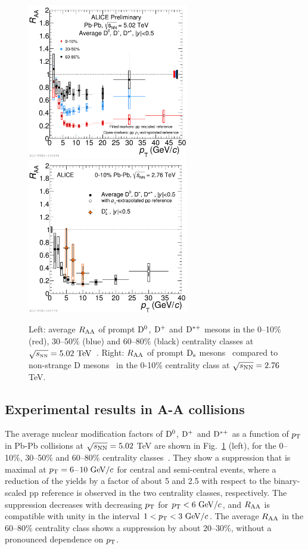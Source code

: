 \begin{figure}[!ht]
  \centering
    \includegraphics[width=7cm]{FigCap2/2017-Jul-05-DmesonAverage_010_3050_6080_comparison_04July2017.pdf}
    \includegraphics[width=7cm]{FigCap2/RAADsD_276.pdf}
  \caption{Left: average $R_{\rm AA}$ 
  of prompt ${\rm D^0}$, ${\rm D^+}$ and ${\rm D^{*+}}$ mesons in the 0--10\% (red), 30--50\% (blue) and 60--80\% (black) centrality classes at $\sqrt{s_{\rm \scriptscriptstyle NN}}=5.02~\mathrm{TeV}$~\cite{ALICE-PUBLIC-2017-003}. Right: $R_{\rm AA}$ of prompt ${\rm D_s}$ mesons~\cite{Adam:2015jda} compared to non-strange D mesons~\cite{Adam:2015sza} in the 0-10\% centrality class at $\sqrt{s_{\rm NN}} = 2.76$ TeV. }
  \label{fig:Raa}
\end{figure}
\subsection{Experimental results in A-A collisions}
The average nuclear modification factors of ${\rm D^0}$, ${\rm D^+}$ and ${\rm D^{*+}}$ as a function of
$p_{\rm T}$ in Pb-Pb collisions at $\sqrt{s_{\rm NN}} = 5.02 $ TeV are shown in Fig.~\ref{fig:Raa} (left), 
for the 0--10\%, 30--50\% and 60--80\% centrality classes~\cite{ALICE-PUBLIC-2017-003}. 
They show a suppression that is
maximal at $p_{\rm T}=6$--$10~\mathrm{GeV}/c$ for central and semi-central events, where a reduction of the yields by
a factor of about 5 and 2.5 with respect to the binary-scaled pp reference is observed 
in the two centrality classes, respectively.
The suppression decreases with decreasing $p_{\rm T}$ for $p_{\rm T}<6~\mathrm{GeV}/c$, and 
$R_{\rm AA}$ is compatible with unity  in the interval $1<p_{\rm T}<3~\mathrm{GeV}/c$.
The average $R_{\rm AA}$ in the 60--80\% centrality class shows a suppression by about 20--30\%, without a pronounced dependence on $p_{\rm T}$.\\


